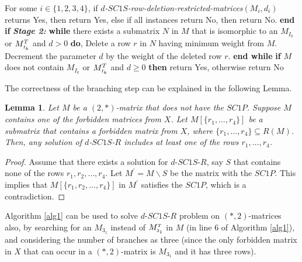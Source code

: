 \documentclass[review, 1p]{elsarticle}
\newtheorem{lemma}{Lemma}
\begin{document}
\begin{algorithm}[h]
\begin{algorithmic}[1]
\noindent For some $i \in \{1,2,3,4\}$, if \textit{$d$-$SC1S$-row-deletion-restricted-matrices}$(M_{i},d_{i})$ returns Yes, then return Yes, else if all instances return No, then return No. \vspace{-0.05 in}  
\State \textbf{end if}\vspace{-0.05 in} \newline \vspace{-0.05 in} 
\noindent \textit{\textbf{Stage 2:}} \vspace{-0.02 in}  
\State \textbf{while} \footnotesize there exists a  submatrix $N$ in $M$ that is isomorphic to an $M_{I_{k}}$ or $M^{T}_{\mathsmaller{I_{k}}}$ and $d>0$ 
 \textbf{do},\vspace{-0.05 in} \normalsize
\State \indent Delete a row $r$ in $N$ having minimum weight from $M$.\vspace{-0.05 in} 
\State \indent Decrement the parameter $d$ by the weight of the deleted row $r$. \vspace{-0.05 in} 
\State \textbf{end while}\vspace{-0.05 in} 
\State \textbf{if} {$M$ does not contain $M_{I_{k}}$ or $M^{T}_{\mathsmaller{I_{k}}}$ and $d \geq 0$} \textbf{then} return Yes, otherwise return No\vspace{-0.06 in} 
\end{algorithmic}
\end{algorithm}
\newline \noindent The correctness of the branching step can be explained in the following Lemma.
 \begin{lemma}\label{corr1}
Let $M$ be a $(2,*)$-matrix that does not have the $SC1P$. Suppose $M$ contains one of the forbidden matrices from $X$. Let $M[\{r_{1},\ldots,r_{4}\}]$ be a submatrix that contains a forbidden matrix from $X$, where $\{r_{1},\ldots,r_{4}\}  \subseteq R(M)$. Then, any solution of $d$-$SC1S$-$R$ includes at least one of the rows $r_{1},\ldots,r_{4}$.
 \end{lemma}
 \begin{proof}
 Assume that there exists a solution for $d$-$SC1S$-$R$, say $S$ that contains none of the rows $r_{1},r_{2},\ldots,r_{4}$. Let $M^{'} = M \backslash S$ be the matrix with the $SC1P$. This implies that $M[\{r_{1},r_{2},\ldots,r_{4}\}]$ in $M^{'}$ satisfies the $SC1P$, which is a contradiction.
 \end{proof}
  Algorithm \ref{alg1} can be used to solve $d$-$SC1S$-$R$ problem on $(*,2)$-matrices also, by searching for an $M_{3_{1}}$ instead of ${M^{\mathsmaller T}_{\mathsmaller 3_{1}}}$ in $M$ (in line $6$ of Algorithm \ref{alg1}), and considering the number of branches as three (since the only forbidden matrix in $X$ that can occur in a $(*,2)$-matrix is $M_{3_{1}}$ and it has three rows). 
\end{document}
